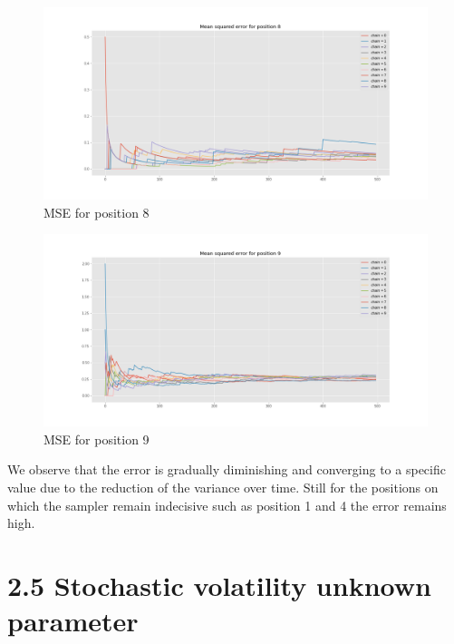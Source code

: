 \documentclass[]{article}
\begin{document}
	\begin{figure}[H]
		\begin{center}
			
			\includegraphics[width=1\textwidth]{task4/figures/T_2_4/Q2/mse_pos8.png}
			\caption*{MSE for position 8}
		\end{center}
	\end{figure}
	
	\begin{figure}[H]
		\begin{center}
			
			\includegraphics[width=1\textwidth]{task4/figures/T_2_4/Q2/mse_pos9.png}
			\caption*{MSE for position 9}
		\end{center}
	\end{figure}
	
	We observe that the error is gradually diminishing and converging to a specific value due to the reduction of the variance over time. Still for the positions on which the sampler remain indecisive such as position 1 and 4 the error remains high. 
	
	\newpage
	
	
	\section*{2.5 Stochastic volatility unknown parameter}
	
\end{document}
